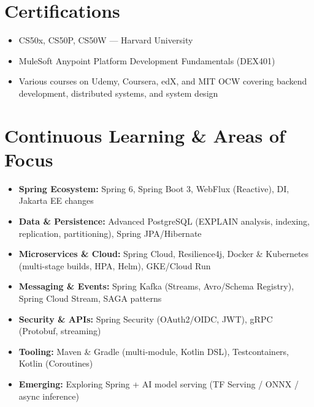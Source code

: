 \documentclass[10pt, a4paper]{article}
\begin{document}
\section*{Certifications}
\begin{itemize}
    \item CS50x, CS50P, CS50W — Harvard University
    \item MuleSoft Anypoint Platform Development Fundamentals (DEX401)
    \item Various courses on Udemy, Coursera, edX, and MIT OCW covering backend development, distributed systems, and system design
\end{itemize}

\section*{Continuous Learning \& Areas of Focus}
\begin{itemize}
    \item \textbf{Spring Ecosystem:} Spring 6, Spring Boot 3, WebFlux (Reactive), DI, Jakarta EE changes
    \item \textbf{Data \& Persistence:} Advanced PostgreSQL (EXPLAIN analysis, indexing, replication, partitioning), Spring JPA/Hibernate
    \item \textbf{Microservices \& Cloud:} Spring Cloud, Resilience4j, Docker \& Kubernetes (multi-stage builds, HPA, Helm), GKE/Cloud Run
    \item \textbf{Messaging \& Events:} Spring Kafka (Streams, Avro/Schema Registry), Spring Cloud Stream, SAGA patterns
    \item \textbf{Security \& APIs:} Spring Security (OAuth2/OIDC, JWT), gRPC (Protobuf, streaming)
    \item \textbf{Tooling:} Maven \& Gradle (multi-module, Kotlin DSL), Testcontainers, Kotlin (Coroutines)
    \item \textbf{Emerging:} Exploring Spring + AI model serving (TF Serving / ONNX / async inference)
\end{itemize}

\end{document}
